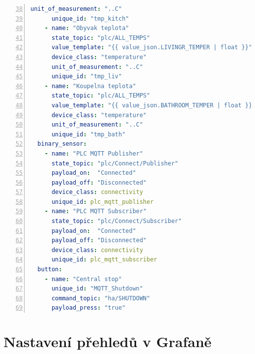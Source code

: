 \pagebreak
\begin{lstlisting}[language=YAML, breaklines=true, numbers=left, firstnumber=38, numberstyle=\small, numbersep=10pt, frame=single, basicstyle=\ttfamily\small]
      unit_of_measurement: "..C"                                
      unique_id: "tmp_kitch"                                   
    - name: "Obyvak teplota"                                   
      state_topic: "plc/ALL_TEMPS"                             
      value_template: "{{ value_json.LIVINGR_TEMPER | float }}" 
      device_class: "temperature"                               
      unit_of_measurement: "..C"                               
      unique_id: "tmp_liv"                                     
    - name: "Koupelna teplota"                                 
      state_topic: "plc/ALL_TEMPS"                             
      value_template: "{{ value_json.BATHROOM_TEMPER | float }}"
      device_class: "temperature"                              
      unit_of_measurement: "..C"                               
      unique_id: "tmp_bath"
  binary_sensor:           
    - name: "PLC MQTT Publisher"              
      state_topic: "plc/Connect/Publisher"         
      payload_on:  "Connected"                                 
      payload_off: "Disconnected"   
      device_class: connectivity
      unique_id: plc_mqtt_publisher
    - name: "PLC MQTT Subscriber"
      state_topic: "plc/Connect/Subscriber"                    
      payload_on:  "Connected"                                 
      payload_off: "Disconnected"
      device_class: connectivity
      unique_id: plc_mqtt_subscriber
  button:                                                      
    - name: "Central stop"                                     
      unique_id: "MQTT_Shutdown"                                
      command_topic: "ha/SHUTDOWN"                              
      payload_press: "true" 
\end{lstlisting}
\chapter{Nastavení přehledů v Grafaně}
\label{apend:grafana}
